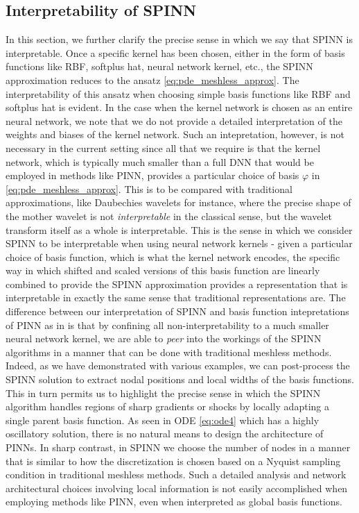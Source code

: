 \documentclass[12pt]{article}
\newcommand{\rr}[1]{#1}
\begin{document}
\subsection{Interpretability of SPINN}
\rr{In this section, we further clarify the precise sense in which we say that SPINN is interpretable. Once a specific kernel has been chosen, either in the form of basis functions like RBF, softplus hat, neural network kernel, etc., the SPINN approximation reduces to the ansatz \eqref{eq:pde_meshless_approx}.  The interpretability of this ansatz when choosing simple basis functions like RBF and softplus hat is evident. In the case when the kernel network is chosen as an entire neural network, we note that we do not provide a detailed interpretation of the weights and biases of the kernel network. Such an intepretation, however, is not necessary in the current setting since all that we require is that the kernel network, which is typically much smaller than a full DNN that would be employed in methods like PINN, provides a particular choice of basis $\varphi$ in \eqref{eq:pde_meshless_approx}. This is to be compared with traditional approximations, like Daubechies wavelets for instance, where the precise shape of the mother wavelet is not \emph{interpretable} in the classical sense, but the wavelet transform itself as a whole is interpretable. This is the sense in which we consider SPINN to be interpretable when using neural network kernels - given a particular choice of basis function, which is what the kernel network encodes, the specific way in which shifted and scaled versions of this basis function are linearly combined to provide the SPINN approximation provides a representation that is interpretable in exactly the same sense that traditional representations are.  The difference between our interpretation of SPINN and basis function intepretations of PINN as in \cite{CGPPT20} is that by confining all non-interpretability to a much smaller neural network kernel, we are able to \emph{peer} into the workings of the SPINN algorithms in a manner that can be done with traditional meshless methods. Indeed, as we have demonstrated with various examples, we can post-process the SPINN solution to extract nodal positions and local widths of the basis functions. This in turn permits us to highlight the precise sense in which the SPINN algorithm handles regions of sharp gradients or shocks by locally adapting a single parent basis function. As seen in ODE \eqref{eq:ode4} which has a highly oscillatory solution, there is no natural means to design the architecture of PINNs. In sharp contrast, in SPINN we choose the number of nodes in a manner that is similar to how the discretization is chosen based on a Nyquist sampling condition in traditional meshless methods. Such a detailed analysis and network architectural choices involving local information is not easily accomplished when employing methods like PINN, even when interpreted as global basis functions.}
\end{document}

